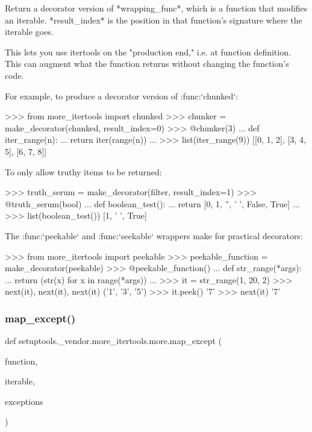 \begin{DoxyVerb}Return a decorator version of *wrapping_func*, which is a function that
modifies an iterable. *result_index* is the position in that function's
signature where the iterable goes.

This lets you use itertools on the "production end," i.e. at function
definition. This can augment what the function returns without changing the
function's code.

For example, to produce a decorator version of :func:`chunked`:

    >>> from more_itertools import chunked
    >>> chunker = make_decorator(chunked, result_index=0)
    >>> @chunker(3)
    ... def iter_range(n):
    ...     return iter(range(n))
    ...
    >>> list(iter_range(9))
    [[0, 1, 2], [3, 4, 5], [6, 7, 8]]

To only allow truthy items to be returned:

    >>> truth_serum = make_decorator(filter, result_index=1)
    >>> @truth_serum(bool)
    ... def boolean_test():
    ...     return [0, 1, '', ' ', False, True]
    ...
    >>> list(boolean_test())
    [1, ' ', True]

The :func:`peekable` and :func:`seekable` wrappers make for practical
decorators:

    >>> from more_itertools import peekable
    >>> peekable_function = make_decorator(peekable)
    >>> @peekable_function()
    ... def str_range(*args):
    ...     return (str(x) for x in range(*args))
    ...
    >>> it = str_range(1, 20, 2)
    >>> next(it), next(it), next(it)
    ('1', '3', '5')
    >>> it.peek()
    '7'
    >>> next(it)
    '7'\end{DoxyVerb}
 \mbox{\label{namespacesetuptools_1_1__vendor_1_1more__itertools_1_1more_ad478e8a78a411590fd37e19d6ba21861}} 
\subsubsection{\texorpdfstring{map\+\_\+except()}{map\_except()}}
{\footnotesize\ttfamily def setuptools.\+\_\+vendor.\+more\+\_\+itertools.\+more.\+map\+\_\+except (\begin{DoxyParamCaption}\item[{}]{function,  }\item[{}]{iterable,  }\item[{}]{exceptions }\end{DoxyParamCaption})}

